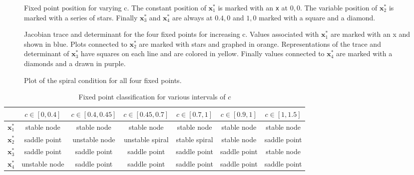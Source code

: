 \begin{figure}
\centering

\caption{Fixed point position for varying c. The constant position of $\mathbf{x}_1^*$ is marked with an \texttt{x} at $0,0$. The variable position of $\mathbf{x}_2^*$ is marked with a series of stars. Finally $\mathbf{x}_3^*$ and $\mathbf{x}_4^*$ are always at $0.4,0$ and $1,0$ marked with a square and a diamond.}




\caption{Jacobian trace and determinant for the four fixed points for increasing c. Values associated with $\mathbf{x}_1^*$ are marked with an x and shown in blue. Plots connected to $\mathbf{x}_2^*$ are marked with stars and graphed in orange. Representations of the trace and determinant of $\mathbf{x}_3^*$ have squares on each line and are colored in yellow. Finally values connected to $\mathbf{x}_4^*$ are marked with a diamonds and a drawn in purple.}
\end{figure}
\begin{figure}
\centering

\caption{Plot of the spiral condition for all four fixed points.}
\end{figure}

\begin{table}
\begin{tabular}{|c|c|c|c|c|c|c|}
\hline
				 &	$c \in [0,0.4] $ & $c \in [0.4,0.45] $ & $c \in [0.45,0.7] $ & $c \in [0.7,1]$ & $c \in [0.9,1]$ & $c \in [1,1.5] $  \\
\hline
$\mathbf{x}_1^*$ &	stable node		 &	stable node		   &	stable node 	 &	 stable node   & stable node  & stable node  	\\
\hline
$\mathbf{x}_2^*$ &	saddle point	 &	unstable node	   &	unstable spiral	 & stable spiral   & stable node  &	saddle point   \\
\hline
$\mathbf{x}_3^*$ &	saddle point	 & saddle point		   &    saddle point	 &	saddle point   & saddle point & stable node		\\
\hline
$\mathbf{x}_4^*$ &	unstable node	 &	saddle point	   &	saddle point	 & saddle point	   & saddle point & saddle point   \\
\hline
\end{tabular}
\caption{Fixed point classification for various intervals of $c$}
\end{table}





